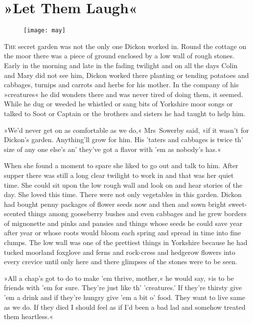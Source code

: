 \chapter{»Let Them Laugh«} 

\begin{figure}[t!]
\centering
\texttt{[image: may]}
\end{figure}

 \lettrine[lines=6]{T}{he} secret garden was not the only one Dickon worked in. Round the cottage on the moor there was a piece of ground enclosed by a low wall of rough stones. Early in the morning and late in the fading twilight and on all the days Colin and Mary did not see him, Dickon worked there planting or tending potatoes and cabbages, turnips and carrots and herbs for his mother. In the company of his »creatures« he did wonders there and was never tired of doing them, it seemed. While he dug or weeded he whistled or sang bits of Yorkshire moor songs or talked to Soot or Captain or the brothers and sisters he had taught to help him.

»We'd never get on as comfortable as we do,« Mrs~Sowerby said, »if it wasn't for Dickon's garden. Anything'll grow for him. His 'taters and cabbages is twice th' size of any one else's an' they've got a flavor with 'em as nobody's has.«

When she found a moment to spare she liked to go out and talk to him. After supper there was still a long clear twilight to work in and that was her quiet time. She could sit upon the low rough wall and look on and hear stories of the day. She loved this time. There were not only vegetables in this garden. Dickon had bought penny packages of flower seeds now and then and sown bright sweet-scented things among gooseberry bushes and even cabbages and he grew borders of mignonette and pinks and pansies and things whose seeds he could save year after year or whose roots would bloom each spring and spread in time into fine clumps. The low wall was one of the prettiest things in Yorkshire because he had tucked moorland foxglove and ferns and rock-cress and hedgerow flowers into every crevice until only here and there glimpses of the stones were to be seen.

»All a chap's got to do to make 'em thrive, mother,« he would say, »is to be friends with 'em for sure. They're just like th' 'creatures.' If they're thirsty give 'em a drink and if they're hungry give 'em a bit o' food. They want to live same as we do. If they died I should feel as if I'd been a bad lad and somehow treated them heartless.«

